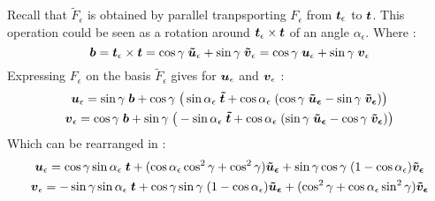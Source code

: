 Recall that $\tilde{F}_\epsilon$ is obtained by parallel tranpsporting $F_\epsilon$ from $\boldsymbol{t}_\epsilon$ to $\boldsymbol{t}$. This operation could be seen as a rotation around $\boldsymbol{t}_\epsilon \times \boldsymbol{t}$ of an angle $\alpha_\epsilon$. Where :
\begin{equation}
	\boldsymbol{b} = \boldsymbol{t}_\epsilon \times \boldsymbol{t}
	 = \cos{\gamma}\;\boldsymbol{\tilde{u}}_\epsilon + \sin{\gamma}\;\boldsymbol{\tilde{v}}_\epsilon
	 = \cos{\gamma}\;\boldsymbol{u}_\epsilon + \sin{\gamma}\;\boldsymbol{v}_\epsilon
\end{equation}
Expressing $F_\epsilon$ on the basis $\tilde{F}_\epsilon$ gives for $\boldsymbol{u}_\epsilon$ and $\boldsymbol{v}_\epsilon$ :
\begin{subequations}
\begin{gather}
		\boldsymbol{u}_\epsilon = \sin{\gamma}\;\boldsymbol{b} + \cos{\gamma}\;\big(\sin{\alpha_\epsilon}\;\boldsymbol{\tilde{t}}
	+ \cos{\alpha_\epsilon}\;(\cos{\gamma}\;\boldsymbol{\tilde{u}_\epsilon}
	- \sin{\gamma}\;\boldsymbol{\tilde{v}_\epsilon})\big) 
		\\
		\boldsymbol{v}_\epsilon = \cos{\gamma}\;\boldsymbol{b} + \sin{\gamma}\;\big(-\sin{\alpha_\epsilon}\;\boldsymbol{\tilde{t}}
	+ \cos{\alpha_\epsilon}\;(\sin{\gamma}\;\boldsymbol{\tilde{u}_\epsilon}
	- \cos{\gamma}\;\boldsymbol{\tilde{v}_\epsilon})\big) 
\end{gather}
\end{subequations}
Which can be rearranged in :
\begin{subequations}
\begin{gather}
		\boldsymbol{u}_\epsilon = \cos{\gamma}\sin{\alpha_\epsilon}\;\boldsymbol{t}
	+ (\cos{\alpha_\epsilon}\cos^2{\gamma}+ \cos^2{\gamma})\boldsymbol{\tilde{u}_\epsilon}
	+ \sin{\gamma}\cos{\gamma}\;(1-\cos{\alpha_\epsilon})\boldsymbol{\tilde{v}_\epsilon}
		\\
		\boldsymbol{v}_\epsilon = -\sin{\gamma}\sin{\alpha_\epsilon}\;\boldsymbol{t}
	+ \cos{\gamma}\sin{\gamma}\;(1-\cos{\alpha_\epsilon})\boldsymbol{\tilde{u}_\epsilon}
	+ (\cos^2{\gamma} + \cos{\alpha_\epsilon}\sin^2{\gamma})\boldsymbol{\tilde{v}_\epsilon}
\end{gather}
\end{subequations}

